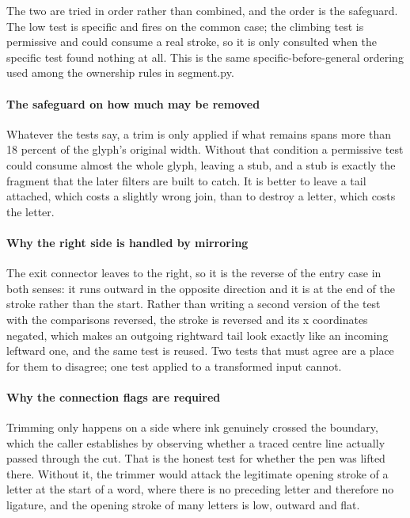 The two are tried in order rather than combined, and the order is the safeguard. The low test is specific and fires on the common case; the climbing test is permissive and could consume a real stroke, so it is only consulted when the specific test found nothing at all. This is the same specific-before-general ordering used among the ownership rules in segment.py.


\paragraph{The safeguard on how much may be removed}
Whatever the tests say, a trim is only applied if what remains spans more than 18 percent of the glyph's original width. Without that condition a permissive test could consume almost the whole glyph, leaving a stub, and a stub is exactly the fragment that the later filters are built to catch. It is better to leave a tail attached, which costs a slightly wrong join, than to destroy a letter, which costs the letter.


\paragraph{Why the right side is handled by mirroring}
The exit connector leaves to the right, so it is the reverse of the entry case in both senses: it runs outward in the opposite direction and it is at the end of the stroke rather than the start. Rather than writing a second version of the test with the comparisons reversed, the stroke is reversed and its x coordinates negated, which makes an outgoing rightward tail look exactly like an incoming leftward one, and the same test is reused. Two tests that must agree are a place for them to disagree; one test applied to a transformed input cannot.


\paragraph{Why the connection flags are required}
Trimming only happens on a side where ink genuinely crossed the boundary, which the caller establishes by observing whether a traced centre line actually passed through the cut. That is the honest test for whether the pen was lifted there. Without it, the trimmer would attack the legitimate opening stroke of a letter at the start of a word, where there is no preceding letter and therefore no ligature, and the opening stroke of many letters is low, outward and flat.


